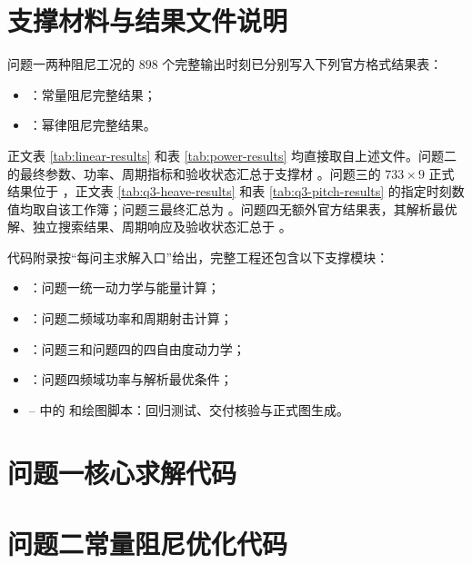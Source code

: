 \documentclass[withoutpreface]{../../../templates/CUMCM2026-Complete-LaTeX/cumcmthesis}
\begin{document}
\clearpage
\begin{appendices}

\section{支撑材料与结果文件说明}

问题一两种阻尼工况的 $898$ 个完整输出时刻已分别写入下列官方格式结果表：
\begin{itemize}[leftmargin=3.2em]
  \item {}：常量阻尼完整结果；
  \item {}：幂律阻尼完整结果。
\end{itemize}
正文表 \ref{tab:linear-results} 和表 \ref{tab:power-results} 均直接取自上述文件。问题二的最终参数、功率、周期指标和验收状态汇总于支撑材 。问题三的 $733\times9$ 正式结果位于 ，正文表 \ref{tab:q3-heave-results} 和表 \ref{tab:q3-pitch-results} 的指定时刻数值均取自该工作簿；问题三最终汇总为 。问题四无额外官方结果表，其解析最优解、独立搜索结果、周期响应及验收状态汇总于 。

代码附录按“每问主求解入口”给出，完整工程还包含以下支撑模块：
\begin{itemize}[leftmargin=3.2em]
  \item {}：问题一统一动力学与能量计算；
  \item {}：问题二频域功率和周期射击计算；
  \item {}：问题三和问题四的四自由度动力学；
  \item {}：问题四频域功率与解析最优条件；
  \item {}– 中的  和绘图脚本：回归测试、交付核验与正式图生成。
\end{itemize}

\section{问题一核心求解代码}


\section{问题二常量阻尼优化代码}



\end{appendices}
\end{document}
